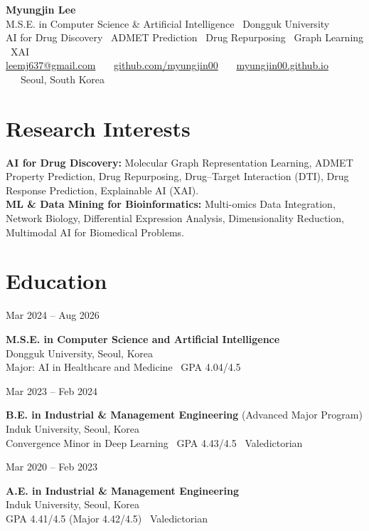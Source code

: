 \documentclass[10.5pt,a4paper]{article}
\newcommand{\entry}[2]{%
  \noindent
  \begin{minipage}[t]{0.16\linewidth}\raggedright{\small\color{muted}#1}\end{minipage}%
  \hspace{0.02\linewidth}%
  \begin{minipage}[t]{0.80\linewidth}\raggedright #2\end{minipage}%
  \par\vspace{3.5pt}%
}
\begin{document}
{\LARGE\bfseries Myungjin Lee}\\[2pt]
{\color{muted} M.S.E. in Computer Science \& Artificial Intelligence \textbullet\ Dongguk University}\\[1pt]
{\color{muted} AI for Drug Discovery \textbullet\ ADMET Prediction \textbullet\ Drug Repurposing \textbullet\ Graph Learning \textbullet\ XAI}\\[4pt]
{\small
\href{mailto:leemj637@gmail.com}{leemj637@gmail.com} \ \textbullet\ \
\href{https://github.com/myungjin00}{github.com/myungjin00} \ \textbullet\ \
\href{https://myungjin00.github.io}{myungjin00.github.io} \ \textbullet\ \
Seoul, South Korea}

\section{Research Interests}
\textbf{AI for Drug Discovery:} Molecular Graph Representation Learning, ADMET Property Prediction, Drug Repurposing, Drug--Target Interaction (DTI), Drug Response Prediction, Explainable AI (XAI).\\[2pt]
\textbf{ML \& Data Mining for Bioinformatics:} Multi-omics Data Integration, Network Biology, Differential Expression Analysis, Dimensionality Reduction, Multimodal AI for Biomedical Problems.

\section{Education}
\entry{Mar 2024 -- Aug 2026}{\textbf{M.S.E. in Computer Science and Artificial Intelligence} \\ Dongguk University, Seoul, Korea \\ {\color{muted}Major: AI in Healthcare and Medicine \textbullet\ GPA 4.04/4.5}}
\entry{Mar 2023 -- Feb 2024}{\textbf{B.E. in Industrial \& Management Engineering} (Advanced Major Program) \\ Induk University, Seoul, Korea \\ {\color{muted}Convergence Minor in Deep Learning \textbullet\ GPA 4.43/4.5 \textbullet\ Valedictorian}}
\entry{Mar 2020 -- Feb 2023}{\textbf{A.E. in Industrial \& Management Engineering} \\ Induk University, Seoul, Korea \\ {\color{muted}GPA 4.41/4.5 (Major 4.42/4.5) \textbullet\ Valedictorian}}
\end{document}
